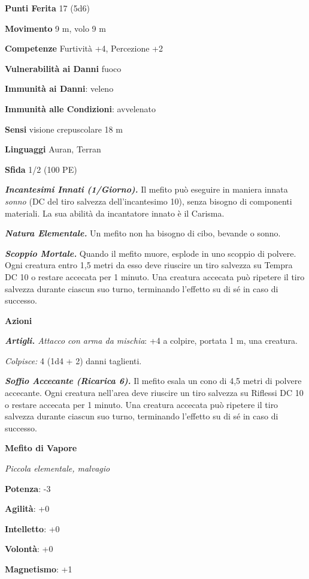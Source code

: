 \begin{multicols}{2}
\textbf{Punti Ferita} 17 (5d6)

\textbf{Movimento} 9 m, volo 9 m

\textbf{Competenze} Furtività +4, Percezione +2

\textbf{Vulnerabilità ai Danni} fuoco

\textbf{Immunità ai Danni}: veleno

\textbf{Immunità alle Condizioni}: avvelenato

\textbf{Sensi} visione crepuscolare 18 m

\textbf{Linguaggi} Auran, Terran

\textbf{Sfida} 1/2 (100 PE)\smallskip

\emph{\textbf{Incantesimi Innati (1/Giorno).}} Il mefito può eseguire in
maniera innata \emph{sonno} (DC del tiro salvezza dell'incantesimo 10),
senza bisogno di componenti materiali. La sua abilità da incantatore
innato è il Carisma.

\emph{\textbf{Natura Elementale.}} Un mefito non ha bisogno di cibo,
bevande o sonno.

\emph{\textbf{Scoppio Mortale.}} Quando il mefito muore, esplode in uno
scoppio di polvere. Ogni creatura entro 1,5 metri da esso deve riuscire
un tiro salvezza su Tempra DC 10 o restare accecata per 1 minuto.
Una creatura accecata può ripetere il tiro salvezza durante ciascun suo
turno, terminando l'effetto su di sé in caso di successo.

\smallskip\textbf{Azioni}

\emph{\textbf{Artigli.} Attacco con arma da mischia}: +4 a colpire,
portata 1 m, una creatura.

\emph{Colpisce:} 4 (1d4 + 2) danni taglienti.

\emph{\textbf{Soffio Accecante (Ricarica 6).}} Il mefito esala un cono
di 4,5 metri di polvere accecante. Ogni creatura nell'area deve riuscire
un tiro salvezza su Riflessi DC 10 o restare accecata per 1 minuto. Una
creatura accecata può ripetere il tiro salvezza durante ciascun suo
turno, terminando l'effetto su di sé in caso di successo.

\textbf{Mefito di Vapore}

\emph{Piccola elementale, malvagio}

\textbf{Potenza}: -3

\textbf{Agilità}: +0

\textbf{Intelletto}: +0

\textbf{Volontà}: +0

\textbf{Magnetismo}: +1


\end{multicols}
